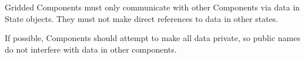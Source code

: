 %


Gridded Components must only communicate with other
Components via data in State objects.  They must 
not make direct references to data in other states.

If possible, Components should attempt to make all
data private, so public names do not interfere with data in
other components.

